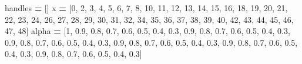 \documentclass[
]{article}
\newenvironment{Shaded}{\begin{snugshade}}{\end{snugshade}}
\newcommand{\DecValTok}[1]{\textcolor[rgb]{0.00,0.00,0.81}{#1}}
\newcommand{\FloatTok}[1]{\textcolor[rgb]{0.00,0.00,0.81}{#1}}
\newcommand{\NormalTok}[1]{#1}
\newcommand{\OperatorTok}[1]{\textcolor[rgb]{0.81,0.36,0.00}{\textbf{#1}}}
\begin{document}
\begin{Shaded}
\begin{Highlighting}[]
\NormalTok{handles }\OperatorTok{=}\NormalTok{ []}
\NormalTok{x }\OperatorTok{=}\NormalTok{ [}\DecValTok{0}\NormalTok{, }\DecValTok{2}\NormalTok{, }\DecValTok{3}\NormalTok{, }\DecValTok{4}\NormalTok{, }\DecValTok{5}\NormalTok{, }\DecValTok{6}\NormalTok{, }\DecValTok{7}\NormalTok{, }\DecValTok{8}\NormalTok{, }\DecValTok{10}\NormalTok{, }\DecValTok{11}\NormalTok{, }\DecValTok{12}\NormalTok{, }\DecValTok{13}\NormalTok{, }\DecValTok{14}\NormalTok{, }\DecValTok{15}\NormalTok{, }\DecValTok{16}\NormalTok{, }\DecValTok{18}\NormalTok{, }\DecValTok{19}\NormalTok{, }\DecValTok{20}\NormalTok{, }\DecValTok{21}\NormalTok{, }\DecValTok{22}\NormalTok{, }\DecValTok{23}\NormalTok{, }\DecValTok{24}\NormalTok{, }\DecValTok{26}\NormalTok{, }\DecValTok{27}\NormalTok{, }\DecValTok{28}\NormalTok{, }\DecValTok{29}\NormalTok{, }\DecValTok{30}\NormalTok{, }\DecValTok{31}\NormalTok{, }\DecValTok{32}\NormalTok{, }\DecValTok{34}\NormalTok{, }\DecValTok{35}\NormalTok{, }\DecValTok{36}\NormalTok{, }\DecValTok{37}\NormalTok{, }\DecValTok{38}\NormalTok{, }\DecValTok{39}\NormalTok{, }\DecValTok{40}\NormalTok{, }\DecValTok{42}\NormalTok{, }\DecValTok{43}\NormalTok{, }\DecValTok{44}\NormalTok{, }\DecValTok{45}\NormalTok{, }\DecValTok{46}\NormalTok{, }\DecValTok{47}\NormalTok{, }\DecValTok{48}\NormalTok{]}
\NormalTok{alpha }\OperatorTok{=}\NormalTok{ [}\DecValTok{1}\NormalTok{, }\FloatTok{0.9}\NormalTok{, }\FloatTok{0.8}\NormalTok{, }\FloatTok{0.7}\NormalTok{, }\FloatTok{0.6}\NormalTok{, }\FloatTok{0.5}\NormalTok{, }\FloatTok{0.4}\NormalTok{, }\FloatTok{0.3}\NormalTok{, }\FloatTok{0.9}\NormalTok{, }\FloatTok{0.8}\NormalTok{, }\FloatTok{0.7}\NormalTok{, }\FloatTok{0.6}\NormalTok{, }\FloatTok{0.5}\NormalTok{, }\FloatTok{0.4}\NormalTok{, }\FloatTok{0.3}\NormalTok{, }\FloatTok{0.9}\NormalTok{, }\FloatTok{0.8}\NormalTok{, }\FloatTok{0.7}\NormalTok{, }\FloatTok{0.6}\NormalTok{, }\FloatTok{0.5}\NormalTok{, }\FloatTok{0.4}\NormalTok{, }\FloatTok{0.3}\NormalTok{, }\FloatTok{0.9}\NormalTok{, }\FloatTok{0.8}\NormalTok{, }\FloatTok{0.7}\NormalTok{, }\FloatTok{0.6}\NormalTok{, }\FloatTok{0.5}\NormalTok{, }\FloatTok{0.4}\NormalTok{, }\FloatTok{0.3}\NormalTok{, }\FloatTok{0.9}\NormalTok{, }\FloatTok{0.8}\NormalTok{, }\FloatTok{0.7}\NormalTok{, }\FloatTok{0.6}\NormalTok{, }\FloatTok{0.5}\NormalTok{, }\FloatTok{0.4}\NormalTok{, }\FloatTok{0.3}\NormalTok{, }\FloatTok{0.9}\NormalTok{, }\FloatTok{0.8}\NormalTok{, }\FloatTok{0.7}\NormalTok{, }\FloatTok{0.6}\NormalTok{, }\FloatTok{0.5}\NormalTok{, }\FloatTok{0.4}\NormalTok{, }\FloatTok{0.3}\NormalTok{]}

\end{Highlighting}
\end{Shaded}
\end{document}
